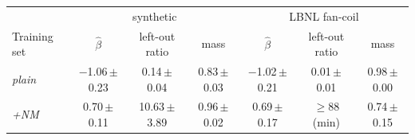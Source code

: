 \begin{tabular}{@{}lccc|ccc@{}}\toprule
 & \multicolumn{3}{c|}{synthetic} & \multicolumn{3}{c}{LBNL fan-coil}\\
Training set & $\hat\beta$ & left-out ratio & mass & $\hat\beta$ & left-out ratio & mass\\\midrule
\emph{plain} & $-$1.06\,{\scriptsize$\pm$0.23} & 0.14\,{\scriptsize$\pm$0.04} & 0.83\,{\scriptsize$\pm$0.03} & $-$1.02\,{\scriptsize$\pm$0.21} & 0.01\,{\scriptsize$\pm$0.01} & 0.98\,{\scriptsize$\pm$0.00}\\
\emph{+NM} & 0.70\,{\scriptsize$\pm$0.11} & 10.63\,{\scriptsize$\pm$3.89} & 0.96\,{\scriptsize$\pm$0.02} & 0.69\,{\scriptsize$\pm$0.17} & $\ge$88 (min) & 0.74\,{\scriptsize$\pm$0.15}\\
\bottomrule\end{tabular}
